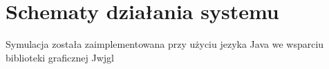 \chapter{Schematy działania systemu}
\label{cha:schematy}

Symulacja została zaimplementowana przy użyciu jezyka Java we wsparciu biblioteki graficznej Jwjgl

